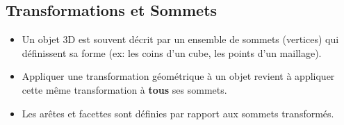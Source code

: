 \documentclass{article}
\begin{document}
\subsection{Transformations et Sommets}

\begin{itemize}
    \item Un objet 3D est souvent décrit par un ensemble de sommets (vertices) qui définissent sa forme (ex: les coins d'un cube, les points d'un maillage).
    \item Appliquer une transformation géométrique à un objet revient à appliquer cette même transformation à \textbf{tous} ses sommets.
    \item Les arêtes et facettes sont définies par rapport aux sommets transformés.
\end{itemize}
\end{document}
